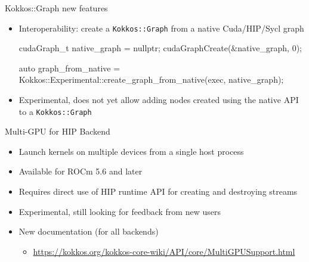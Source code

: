 \begin{frame}[fragile]{Kokkos::Graph new features}
 \begin{itemize}
   \item Interoperability: create a \texttt{Kokkos::Graph} from a native Cuda/HIP/Sycl graph
     \begin{code}[keywords={create_graph_from_native}]
cudaGraph_t native_graph = nullptr;
cudaGraphCreate(&native_graph, 0);

auto graph_from_native =
  Kokkos::Experimental::create_graph_from_native(exec, native_graph);
     \end{code}
    \item Experimental, does not yet allow adding nodes created using the native API to a \texttt{Kokkos::Graph}
 \end{itemize}
\end{frame}





\begin{frame}[fragile]{Multi-GPU for HIP Backend}
  \begin{itemize}
    \item Launch kernels on multiple devices from a single host process
    \item Available for ROCm 5.6 and later
    \item Requires direct use of HIP runtime API for creating and destroying streams
    \item Experimental, still looking for feedback from new users
    \item New documentation (for all backends)  
      \begin{itemize} 
        \item[] \url{https://kokkos.org/kokkos-core-wiki/API/core/MultiGPUSupport.html}
      \end{itemize}
  \end{itemize}
\end{frame}

